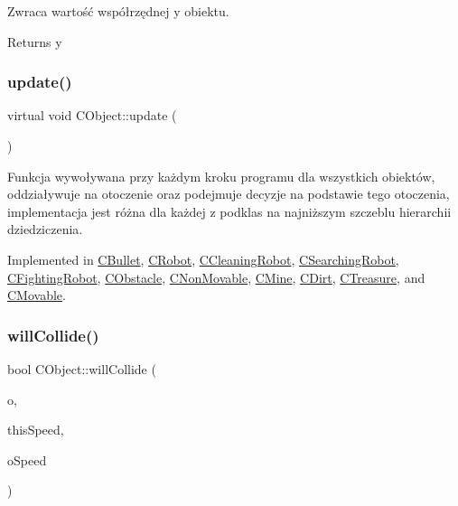 Zwraca wartość współrzędnej y obiektu. 

\begin{DoxyReturn}{Returns}
y 
\end{DoxyReturn}
\mbox{\label{class_c_object_acb42ca516e836d0267ddb9a0556916a9}} 
\subsubsection{\texorpdfstring{update()}{update()}}
{\footnotesize\ttfamily virtual void C\+Object\+::update (\begin{DoxyParamCaption}{ }\end{DoxyParamCaption})\hspace{0.3cm}{\ttfamily [pure virtual]}}



Funkcja wywoływana przy każdym kroku programu dla wszystkich obiektów, oddziaływuje na otoczenie oraz podejmuje decyzje na podstawie tego otoczenia, implementacja jest różna dla każdej z podklas na najniższym szczeblu hierarchii dziedziczenia. 



Implemented in \mbox{\hyperlink{class_c_bullet_a9685917f7fc76d417e03744223b1b2c6}{C\+Bullet}}, \mbox{\hyperlink{class_c_robot_a8ad8d55a840ced20f85a2a045e9e24ef}{C\+Robot}}, \mbox{\hyperlink{class_c_cleaning_robot_afd8b3a58abfc91ebdce32af3686c5e9f}{C\+Cleaning\+Robot}}, \mbox{\hyperlink{class_c_searching_robot_a6e9cdc9eccd32a470d8953f1a3cccd46}{C\+Searching\+Robot}}, \mbox{\hyperlink{class_c_fighting_robot_a3ae0ea383f809766e53c81348a07daaa}{C\+Fighting\+Robot}}, \mbox{\hyperlink{class_c_obstacle_a9aeb124d28bdef3430954f5e2b5ae0f0}{C\+Obstacle}}, \mbox{\hyperlink{class_c_non_movable_ace03bea0246940c6c5c0b26ffa1ef165}{C\+Non\+Movable}}, \mbox{\hyperlink{class_c_mine_aef4825eff1e61d284d3da7a2d630acb5}{C\+Mine}}, \mbox{\hyperlink{class_c_dirt_a0f077e7fde1b397f08659f65d28cf573}{C\+Dirt}}, \mbox{\hyperlink{class_c_treasure_a5030f2a7279aa608c40741f9e7040a90}{C\+Treasure}}, and \mbox{\hyperlink{class_c_movable_af45fc62960d86ef62949d078141e9d62}{C\+Movable}}.

\mbox{\label{class_c_object_a24bf5bc6cf7e76478ac7ccc7c79cdd72}} 
\subsubsection{\texorpdfstring{will\+Collide()}{willCollide()}}
{\footnotesize\ttfamily bool C\+Object\+::will\+Collide (\begin{DoxyParamCaption}\item[{\mbox{\hyperlink{class_c_object}{C\+Object}} $\ast$}]{o,  }\item[{qreal}]{this\+Speed,  }\item[{qreal}]{o\+Speed }\end{DoxyParamCaption})}



